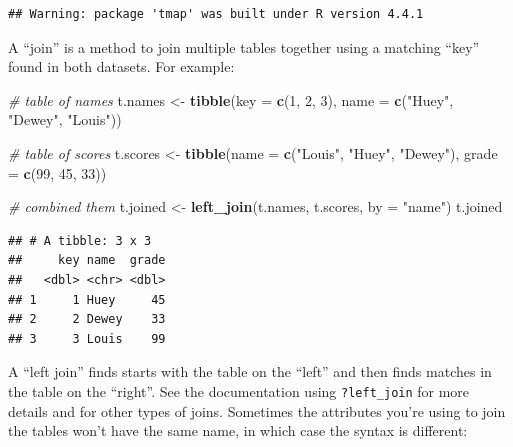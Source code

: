 \documentclass[]{article}
\newenvironment{Shaded}{\begin{snugshade}}{\end{snugshade}}
\newcommand{\AttributeTok}[1]{\textcolor[rgb]{0.13,0.29,0.53}{#1}}
\newcommand{\CommentTok}[1]{\textcolor[rgb]{0.56,0.35,0.01}{\textit{#1}}}
\newcommand{\DecValTok}[1]{\textcolor[rgb]{0.00,0.00,0.81}{#1}}
\newcommand{\FunctionTok}[1]{\textcolor[rgb]{0.13,0.29,0.53}{\textbf{#1}}}
\newcommand{\NormalTok}[1]{#1}
\newcommand{\OtherTok}[1]{\textcolor[rgb]{0.56,0.35,0.01}{#1}}
\newcommand{\StringTok}[1]{\textcolor[rgb]{0.31,0.60,0.02}{#1}}
\begin{document}
\begin{verbatim}
## Warning: package 'tmap' was built under R version 4.4.1
\end{verbatim}

A ``join'' is a method to join multiple tables together using a matching
``key'' found in both datasets. For example:

\begin{Shaded}
\begin{Highlighting}[]
\CommentTok{\# table of names}
\NormalTok{t.names }\OtherTok{\textless{}{-}} \FunctionTok{tibble}\NormalTok{(}\AttributeTok{key =} \FunctionTok{c}\NormalTok{(}\DecValTok{1}\NormalTok{, }\DecValTok{2}\NormalTok{, }\DecValTok{3}\NormalTok{), }
             \AttributeTok{name =} \FunctionTok{c}\NormalTok{(}\StringTok{"Huey"}\NormalTok{, }\StringTok{"Dewey"}\NormalTok{, }\StringTok{"Louis"}\NormalTok{))}

\CommentTok{\# table of scores}
\NormalTok{t.scores }\OtherTok{\textless{}{-}} \FunctionTok{tibble}\NormalTok{(}\AttributeTok{name =} \FunctionTok{c}\NormalTok{(}\StringTok{"Louis"}\NormalTok{, }\StringTok{"Huey"}\NormalTok{, }\StringTok{"Dewey"}\NormalTok{),}
                   \AttributeTok{grade =} \FunctionTok{c}\NormalTok{(}\DecValTok{99}\NormalTok{, }\DecValTok{45}\NormalTok{, }\DecValTok{33}\NormalTok{))}

\CommentTok{\# combined them}
\NormalTok{t.joined }\OtherTok{\textless{}{-}} \FunctionTok{left\_join}\NormalTok{(t.names, t.scores, }\AttributeTok{by =} \StringTok{"name"}\NormalTok{)}
\NormalTok{t.joined}
\end{Highlighting}
\end{Shaded}

\begin{verbatim}
## # A tibble: 3 x 3
##     key name  grade
##   <dbl> <chr> <dbl>
## 1     1 Huey     45
## 2     2 Dewey    33
## 3     3 Louis    99
\end{verbatim}

A ``left join'' finds starts with the table on the ``left'' and then
finds matches in the table on the ``right''. See the documentation using
\texttt{?left\_join} for more details and for other types of joins.
Sometimes the attributes you're using to join the tables won't have the
same name, in which case the syntax is different:
\end{document}
